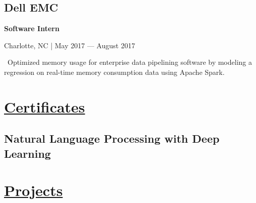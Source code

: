 \documentclass{article}
\begin{document}
\begin{minipage}[t]{0.45\textwidth\hspace{0in}}
        \vspace{0.3em}
        \subsection{Dell EMC}
        \vspace{-0.5em}\hspace{0.1em}
        \mdseries\bfseries{Software Intern}
        \vspace{0.1em}
        
        \hspace{0.5em}\mdseries\textrm{Charlotte, NC | May 2017 — August 2017}

        \vspace{-0.4em}
        \begin{minipage}[t]{3.75in\textwidth\hspace{0in}}
            \vspace{0.1em}
            \hspace{1em}\textasteriskcentered \, \mdseries\textrm{Optimized memory usage for enterprise data pipelining software
            by modeling a regression on real-time memory consumption data
            using Apache Spark.}
        \end{minipage}

        \section{\underline{Certificates}}
        \subsection{Natural Language Processing with Deep Learning}

        \section{\underline{Projects}}
\end{minipage}
\end{document}
